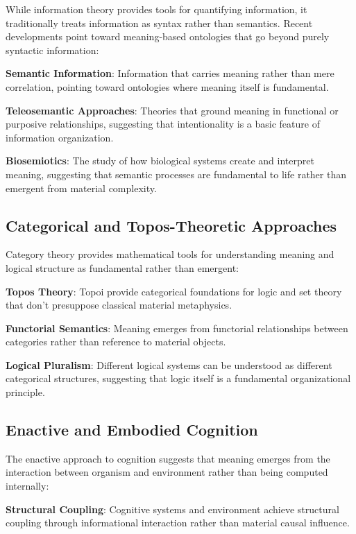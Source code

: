 \documentclass[12pt]{article}
\begin{document}
While information theory provides tools for quantifying information, it traditionally treats information as syntax rather than semantics. Recent developments point toward meaning-based ontologies that go beyond purely syntactic information:

\textbf{Semantic Information}: Information that carries meaning rather than mere correlation, pointing toward ontologies where meaning itself is fundamental.

\textbf{Teleosemantic Approaches}: Theories that ground meaning in functional or purposive relationships, suggesting that intentionality is a basic feature of information organization.

\textbf{Biosemiotics}: The study of how biological systems create and interpret meaning, suggesting that semantic processes are fundamental to life rather than emergent from material complexity.

\subsection{Categorical and Topos-Theoretic Approaches}

Category theory provides mathematical tools for understanding meaning and logical structure as fundamental rather than emergent:

\textbf{Topos Theory}: Topoi provide categorical foundations for logic and set theory that don't presuppose classical material metaphysics.

\textbf{Functorial Semantics}: Meaning emerges from functorial relationships between categories rather than reference to material objects.

\textbf{Logical Pluralism}: Different logical systems can be understood as different categorical structures, suggesting that logic itself is a fundamental organizational principle.

\subsection{Enactive and Embodied Cognition}

The enactive approach to cognition suggests that meaning emerges from the interaction between organism and environment rather than being computed internally:

\textbf{Structural Coupling}: Cognitive systems and environment achieve structural coupling through informational interaction rather than material causal influence.
\end{document}
